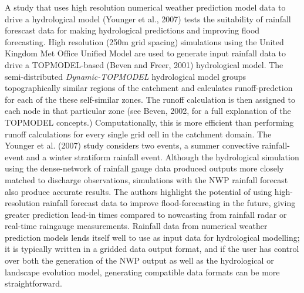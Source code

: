 \documentclass[12pt,oneside,PhD]{muthesis}
\begin{document}
A study that uses high resolution numerical weather prediction model data  to drive a hydrological model (Younger et al., 2007) tests the suitability of rainfall forescast data for making hydrological predictions and improving flood forecasting. High resolution (250m grid spacing) simulations using the United Kingdom Met Office Unified Model are used to generate input rainfall data to drive a TOPMODEL-based (Beven and Freer, 2001) hydrological model. The semi-distributed \textit{Dynamic-TOPMODEL} hydrological model groups topographically similar regions of the catchment and calculates runoff-predction for each of the these self-similar zones. The runoff calculation is then assigned to each node in that particular zone (see Beven, 2002, for a full explanation of the TOPMODEL concepts.) Computationally, this is more efficient than performing runoff calculations for every single grid cell in the catchment domain.
The Younger et al. (2007) study considers two events, a summer convective rainfall-event and a winter stratiform rainfall event. Although the hydrological simulation using the dense-network of rainfall gauge data produced outputs more closely matched to discharge observations, simulations with the NWP rainfall forecast also produce accurate results. The authors highlight the potential of using high-resolution rainfall forecast data to improve flood-forecasting in the future, giving greater prediction lead-in times compared to nowcasting from rainfall radar or real-time raingauge measurements. Rainfall data from numerical weather prediction models lends itself well to use as input data for hydrological modelling; it is typically written in a gridded data output format, and if the user has control over both the generation of the NWP output as well as the hydrological or landscape evolution model, generating compatible data formats can be more straightforward.
\end{document}
